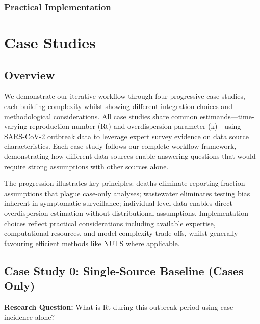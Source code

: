 \documentclass{article}
\begin{document}
\subsubsection{Practical Implementation}

\section{Case Studies}

\subsection{Overview}

We demonstrate our iterative workflow through four progressive case studies, each building complexity whilst showing different integration choices and methodological considerations.
All case studies share common estimands—time-varying reproduction number (Rt) and overdispersion parameter (k)—using SARS-CoV-2 outbreak data to leverage expert survey evidence on data source characteristics.
Each case study follows our complete workflow framework, demonstrating how different data sources enable answering questions that would require strong assumptions with other sources alone.

The progression illustrates key principles: deaths eliminate reporting fraction assumptions that plague case-only analyses; wastewater eliminates testing bias inherent in symptomatic surveillance; individual-level data enables direct overdispersion estimation without distributional assumptions.
Implementation choices reflect practical considerations including available expertise, computational resources, and model complexity trade-offs, whilst generally favouring efficient methods like NUTS where applicable.

\subsection{Case Study 0: Single-Source Baseline (Cases Only)}

\textbf{Research Question:} What is Rt during this outbreak period using case incidence alone?
\end{document}
